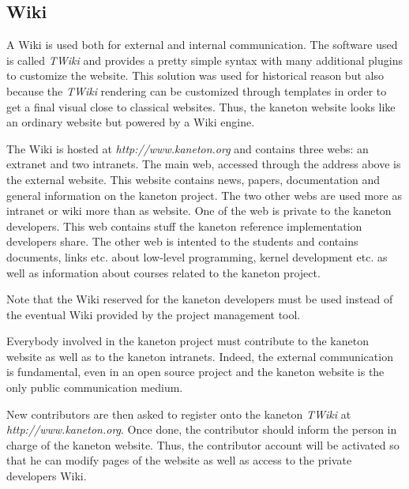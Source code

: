 %
%
%
%
%
%

%
%

\subsection{Wiki}

A Wiki is used both for external and internal communication. The software
used is called \textit{TWiki} and provides a pretty simple syntax with
many additional plugins to customize the website. This solution was used
for historical reason but also because the \textit{TWiki} rendering can
be customized through templates in order to get a final visual close to
classical websites. Thus, the kaneton website looks like an ordinary
website but powered by a Wiki engine.

The Wiki is hosted at \textit{http://www.kaneton.org} and contains three
webs: an extranet and two intranets. The main web, accessed through the
address above is the external website. This website contains news, papers,
documentation and general information on the kaneton project. The two other
webs are used more as intranet or wiki more than as website. One of the web
is private to the kaneton developers. This web contains stuff the kaneton
reference implementation developers share. The other web is intented to the
students and contains documents, links etc. about low-level programming, kernel
development etc. as well as information about courses related to the
kaneton project.

Note that the Wiki reserved for the kaneton developers must be used
instead of the eventual Wiki provided by the project management tool.

Everybody involved in the kaneton project must contribute to the kaneton
website as well as to the kaneton intranets. Indeed, the external communication
is fundamental, even in an open source project and the kaneton website is
the only public communication medium.

New contributors are then asked to register onto the kaneton \textit{TWiki}
at \textit{http://www.kaneton.org}. Once done, the contributor should
inform the person in charge of the kaneton website. Thus, the contributor
account will be activated so that he can modify pages of the website as
well as access to the private developers Wiki.
